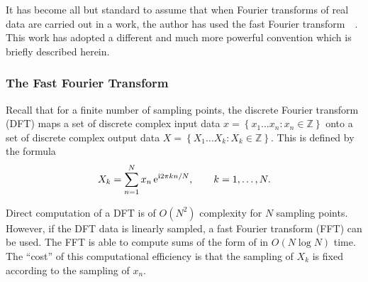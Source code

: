 It has become all but standard to assume that when Fourier transforms of
real data are carried out in a work, the author has used the fast Fourier
transform~\cite{frigo1998fftw}~\cite{cooley1965algorithm}.  This work has
adopted a different and much more powerful convention which is briefly
described herein.

\subsubsection{The Fast Fourier Transform}
Recall that for a finite number of sampling points, the discrete
Fourier transform (DFT) maps a set of discrete complex input data
$x = \left\{x_1\dots x_n : x_n\in\mathbb{Z}\right\}$ onto a set of
discrete complex output data $X =
  \left\{X_1\dots X_k : X_k\in\mathbb{Z}\right\}$.  This is defined by the
formula
\begin{equation}
  X_k = \sum_{n=1}^{N} x_n\, {\mathrm{e}}^{{\mathrm{i}} 2\pi k n/N}, \qquad k=1,\ldots,N.
  \label{eqn:dft}
\end{equation}

Direct computation of a DFT is of $O(N^2)$ complexity for $N$ sampling
points.  However, if the DFT data is linearly sampled, a fast Fourier
transform (FFT) can be used. The FFT is able to compute sums of the form of
 in $O(N \log N)$ time.  The ``cost'' of this
computational efficiency is that the sampling of $X_k$ is fixed
according to the sampling of $x_n$.

